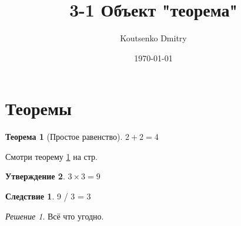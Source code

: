 \documentclass[a4paper,12pt]{article}                       %
\title{3-1 Объект "теорема"}
\author{Koutsenko Dmitry}
\date{\today}
\theoremstyle{plain}                                        %
\newtheorem{theorem}{Теорема}[section]
\newtheorem{proposition}[theorem]{Утверждение}
\theoremstyle{definition}                                   %
\newtheorem{corollary}{Следствие}[theorem]
\theoremstyle{remark}                                       %
\newtheorem*{nonum}{Решение}
\begin{document}

\maketitle

\section{Теоремы}

\begin{theorem}[Простое равенство]\label{theorem1}
    $2+2=4$
\end{theorem}

Смотри теорему \ref{theorem1} на стр. \pageref{theorem1}

\begin{proposition}
    $3\times 3 = 9$
\end{proposition}

\begin{corollary}
    9 / 3 = 3
\end{corollary}

\begin{nonum}
    Всё что угодно.
\end{nonum}
\end{document}
